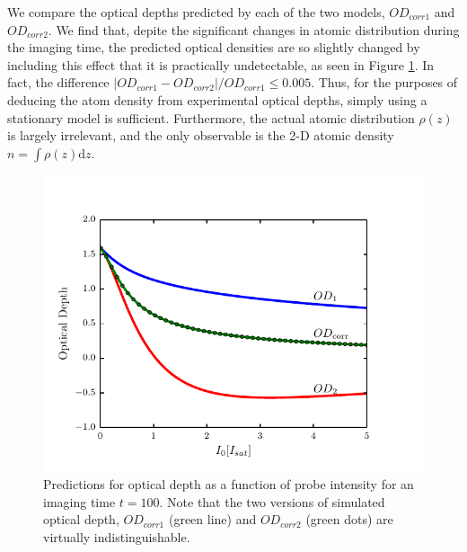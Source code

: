 \documentclass[12pt]{iopart}
\begin{document}
\par We compare the optical depths predicted by each of the two models, $OD_{corr1}$ and $OD_{corr2}$. We find that, depite the significant changes in atomic distribution during the imaging time, the predicted optical densities are so slightly changed by including this effect that it is practically undetectable, as seen in Figure \ref{fig:atomTravel}. In fact, the difference $\left|OD_{corr1}-OD_{corr2}\right|/OD_{corr1} \le 0.005$. Thus, for the purposes of deducing the atom density from experimental optical depths, simply using a stationary model is sufficient. Furthermore, the actual atomic distribution $\rho(z)$ is largely irrelevant, and the only observable is the 2-D atomic density $n=\int\rho(z)\mathrm{d}z$. 
\begin{figure}
	\includegraphics{figure7.pdf}
\caption{Predictions for optical depth as a function of probe intensity for an imaging time $t=100$\us. Note that the two versions of simulated optical depth, $OD_{corr1}$ (green line) and $OD_{corr2}$ (green dots) are virtually indistinguishable. }  
\label{fig:atomTravel}
\end{figure}
\end{document}
